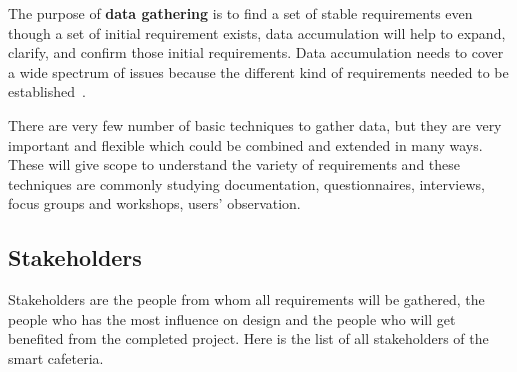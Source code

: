 The purpose of \textbf{data gathering} is to find  a set of stable requirements
even though a set of initial requirement exists, data accumulation will help to
expand, clarify, and confirm those initial requirements. Data accumulation needs
to cover a wide spectrum of issues because the different kind of requirements
needed to be established~\cite{preece2002interaction}.

There are very few number of basic techniques to gather data, but they are very
important and flexible which could be combined and extended in many ways.
These will give scope to understand the  variety of requirements and these
techniques are commonly studying documentation, questionnaires, interviews,
focus groups and workshops, users' observation.

\subsection{Stakeholders}
\label{subsec:Stakeholders}
Stakeholders are the people from whom all requirements will be gathered, the
people who has the most influence on design and the people who will get 
benefited from the completed project. Here is the list of all stakeholders of the
smart cafeteria.
